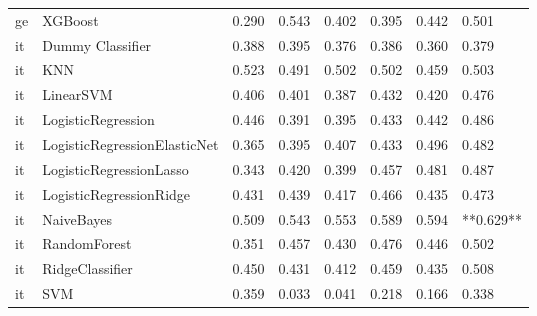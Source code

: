 \begin{tabular}{llllllll}
      ge &                      XGBoost & 0.290 &                     0.543 &                 0.402 &                  0.395 &                                   0.442 &     0.501 \\
      it &             Dummy Classifier & 0.388 &                     0.395 &                 0.376 &                  0.386 &                                   0.360 &     0.379 \\
      it &                          KNN & 0.523 &                     0.491 &                 0.502 &                  0.502 &                                   0.459 &     0.503 \\
      it &                    LinearSVM & 0.406 &                     0.401 &                 0.387 &                  0.432 &                                   0.420 &     0.476 \\
      it &           LogisticRegression & 0.446 &                     0.391 &                 0.395 &                  0.433 &                                   0.442 &     0.486 \\
      it & LogisticRegressionElasticNet & 0.365 &                     0.395 &                 0.407 &                  0.433 &                                   0.496 &     0.482 \\
      it &      LogisticRegressionLasso & 0.343 &                     0.420 &                 0.399 &                  0.457 &                                   0.481 &     0.487 \\
      it &      LogisticRegressionRidge & 0.431 &                     0.439 &                 0.417 &                  0.466 &                                   0.435 &     0.473 \\
      it &                   NaiveBayes & 0.509 &                     0.543 &                 0.553 &                  0.589 &                                   0.594 & **0.629** \\
      it &                 RandomForest & 0.351 &                     0.457 &                 0.430 &                  0.476 &                                   0.446 &     0.502 \\
      it &              RidgeClassifier & 0.450 &                     0.431 &                 0.412 &                  0.459 &                                   0.435 &     0.508 \\
      it &                          SVM & 0.359 &                     0.033 &                 0.041 &                  0.218 &                                   0.166 &     0.338 \\

\end{tabular}
